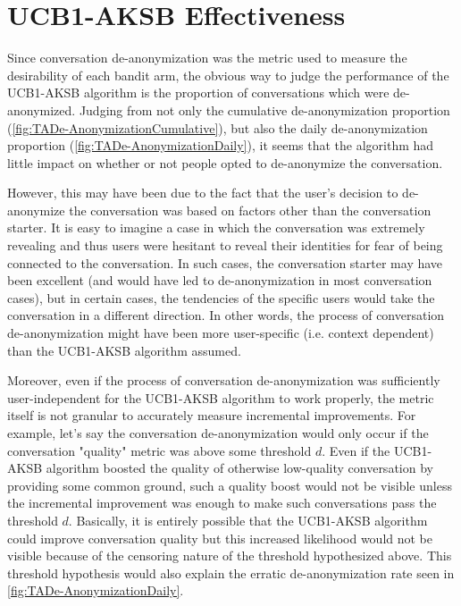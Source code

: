 \section{UCB1-AKSB Effectiveness}

Since conversation de-anonymization was the metric used to measure the desirability of each bandit arm, the obvious way to judge the performance of the UCB1-AKSB algorithm is the proportion of conversations which were de-anonymized. Judging from not only the cumulative de-anonymization proportion (\ref{fig:TADe-AnonymizationCumulative}), but also the daily de-anonymization proportion (\ref{fig:TADe-AnonymizationDaily}), it seems that the algorithm had little impact on whether or not people opted to de-anonymize the conversation. 

However, this may have been due to the fact that the user's decision to de-anonymize the conversation was based on factors other than the conversation starter. It is easy to imagine a case in which the conversation was extremely revealing and thus users were hesitant to reveal their identities for fear of being connected to the conversation. In such cases, the conversation starter may have been excellent (and would have led to de-anonymization in most conversation cases), but in certain cases, the tendencies of the specific users would take the conversation in a different direction. In other words, the process of conversation de-anonymization might have been more user-specific (i.e. context dependent) than the UCB1-AKSB algorithm assumed. 

Moreover, even if the process of conversation de-anonymization was sufficiently user-independent for the UCB1-AKSB algorithm to work properly, the metric itself is not granular to accurately measure incremental improvements. For example, let's say the conversation de-anonymization would only occur if the conversation "quality" metric was above some threshold $d$. Even if the UCB1-AKSB algorithm boosted the quality of otherwise low-quality conversation by providing some common ground, such a quality boost would not be visible unless the incremental improvement was enough to make such conversations pass the threshold $d$. Basically, it is entirely possible that the UCB1-AKSB algorithm could improve conversation quality but this increased likelihood would not be visible because of the censoring nature of the threshold hypothesized above. This threshold hypothesis would also explain the erratic de-anonymization rate seen in \ref{fig:TADe-AnonymizationDaily}.

